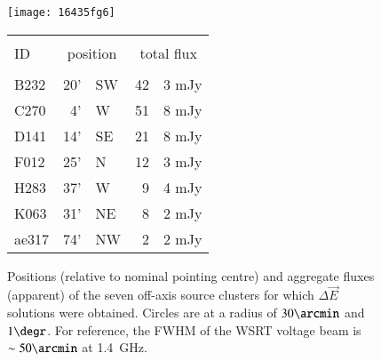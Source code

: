 \documentclass{aa}
\newcommand{\jones}[2]{\vec {#1}_{#2}}
\begin{document}
\begin{figure}
\begin{minipage}[c]{.45\columnwidth}
\texttt{[image: 16435fg6]}
\end{minipage}\hfill\begin{minipage}[c]{.5\columnwidth}
\begin{tabular}{lr@{ }lr@{.}l}
\hline
\hline
& & \\ [-1ex]
ID & \multicolumn{2}{c}{position} & \multicolumn{2}{c}{total flux} \\
\hline
& & \\ [-1ex]
B232  & 20' & SW & 42 & 3 mJy\\
C270  &  4' & W  & 51 & 8 mJy\\
D141  & 14' & SE & 21 & 8 mJy\\
F012  & 25' & N  & 12 & 3 mJy \\
H283  & 37' & W  &  9 & 4 mJy \\
K063  & 31' & NE &  8 & 2 mJy \\
ae317 & 74' & NW &  2 & 2 mJy \\
\hline
\end{tabular}
\end{minipage}

\caption{\label{fig:source-plot}Positions (relative to nominal pointing centre) and aggregate fluxes (apparent) of the seven off-axis source clusters for which $\Delta\jones{E}{}$ solutions were obtained. Circles are at a radius of $30\arcmin$ and $1\degr$. For reference, the FWHM of the WSRT voltage beam is $\sim50\arcmin$ at 1.4~GHz.}
\end{figure}
\end{document}
